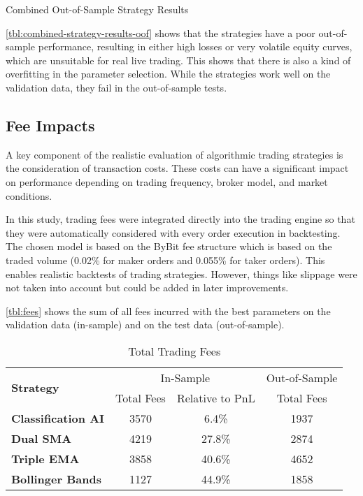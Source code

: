 \begin{table}[H]
    
    \caption{Combined Out-of-Sample Strategy Results}
    \label{tbl:combined-strategy-results-oof}
\end{table}


\noindent
\autoref{tbl:combined-strategy-results-oof} shows that the strategies have a poor out-of-sample performance, resulting in either high losses or very volatile equity curves, which are unsuitable for real live trading.
This shows that there is also a kind of overfitting in the parameter selection.
While the strategies work well on the validation data, they fail in the out-of-sample tests.

\subsection{Fee Impacts}

A key component of the realistic evaluation of algorithmic trading strategies is the consideration of transaction costs.
These costs can have a significant impact on performance depending on trading frequency, broker model, and market conditions.

In this study, trading fees were integrated directly into the trading engine so that they were automatically considered with every order execution in backtesting.
The chosen model is based on the ByBit fee structure which is based on the traded volume (0.02\% for maker orders and 0.055\% for taker orders).
This enables realistic backtests of trading strategies.
However, things like slippage were not taken into account but could be added in later improvements.

\autoref{tbl:fees} shows the sum of all fees incurred with the best parameters on the validation data (in-sample) and on the test data (out-of-sample).

\begin{table}[H]
    \centering
    \centering
    \begin{tabular}{l|ccc}
        \toprule
        \multirow{2}{*}{\textbf{Strategy}} & \multicolumn{2}{c}{In-Sample} & Out-of-Sample \\
        & Total Fees & Relative to PnL & Total Fees \\
        \midrule
        \textbf{Classification AI} & 3570       & 6.4\%           & 1937       \\
        \textbf{Dual SMA}          & 4219       & 27.8\%          & 2874       \\
        \textbf{Triple EMA}        & 3858       & 40.6\%          & 4652       \\
        \textbf{Bollinger Bands}   & 1127       & 44.9\%          & 1858       \\
        \bottomrule
    \end{tabular}
    \label{tbl:fees}
    \caption{Total Trading Fees}
\end{table}

